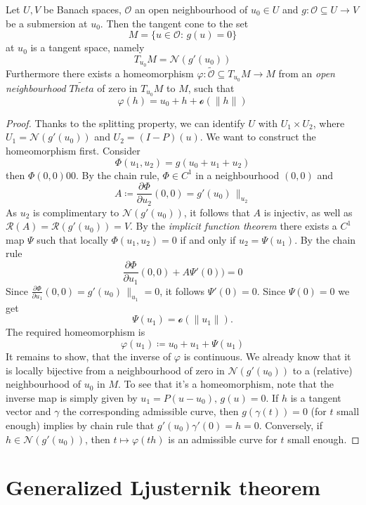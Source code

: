 \begin{theorem}[Ljusternik, 1934]\label{theorem_1.29}
	Let $U,V$ be Banach spaces, $\mathcal{O}$ an open neighbourhood of $u_0\in U$ and $g:\mathcal{O}\subseteq U\to V$ be a submersion at $u_0$. Then the tangent cone to the set
	\[
		M=\{u\in\mathcal{O}:\,g(u)=0\}
	\]
	at $u_0$ is a tangent space, namely
	\[
		T_{u_0}M = \mathcal{N}(g'(u_0))
	\]
	Furthermore there exists a homeomorphism $\varphi:\tilde{\mathcal{O}}\subseteq T_{u_0}M\to M$ from an \emph{open neighbourhood} $\tilde{Theta}$ of zero in $T_{u_0}M$ to $M$, such that
	\[
		\varphi(h) = u_0+h + \mathcal{o}(\|h\|)
	\]
\end{theorem}
\begin{proof}
	Thanks to the splitting property, we can identify $U$ with $U_1\times U_2$, where $U_1=\mathcal{N}(g'(u_0))$ and $U_2 = (I-P)(u)$. We want to construct the homeomorphism first. Consider
	\[
		\Phi(u_1,u_2) = g(u_0+u_1+u_2)
	\]
	then $\Phi(0,0) 0 0$. By the chain rule, $\Phi\in C^1$ in a neighbourhood $(0,0)$ and 
	\[
		A \coloneqq \frac{\partial\Phi}{\partial u_2}(0,0) = g'(u_0)\,\parallel_{u_2}
	\]
	As $u_2$ is complimentary to $\mathcal{N}(g'(u_0))$, it follows that $A$ is injectiv, as well as $\mathcal{R}(A) = \mathcal{R}(g'(u_0)) = V$. By the \emph{implicit function theorem} there exists a $C^1$ map $\Psi$ such that locally $\Phi(u_1,u_2) = 0$ if and only if $u_2=\Psi(u_1)$. By the chain rule 
	\[
		\frac{\partial\Phi}{\partial u_1}(0,0) + A\Psi'(0)) = 0 
	\]
	Since $\frac{\partial\Phi}{\partial u_1}(0,0) = g'(u_0)\,\parallel_{u_1} = 0$, it follows $\Psi'(0) = 0$. Since $\Psi(0) = 0$ we get
	\[
		\Psi(u_1) = \mathcal{o}(\|u_1\|).
	\]
	The required homeomorphism is
	\[
		\varphi(u_1) \coloneqq u_0 + u_1 + \Psi(u_1)
	\]
	It remains to show, that the inverse of $\varphi$ is continuous. We already know that it is locally bijective from a neighbourhood of zero in $\mathcal{N}(g'(u_0))$ to a (relative) neighbourhood of $u_0$ in $M$. To see that it's a homeomorphism, note that the inverse map is simply given by $u_1 = P(u-u_0),\,g(u) = 0$. \newline\noindent
	If $h$ is a tangent vector and $\gamma$ the corresponding admissible curve, then $g(\gamma(t))=0$ (for $t$ small enough) implies by chain rule that $g'(u_0)\gamma'(0)=h=0$. \newline\noindent
	Conversely, if $h\in\mathcal{N}(g'(u_0))$, then $t\mapsto \varphi(th)$ is an admissible curve for $t$ small enough.   
\end{proof}

\section*{Generalized Ljusternik theorem}

